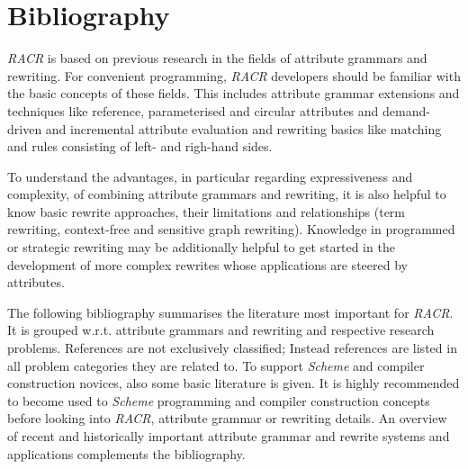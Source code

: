 

\chapter{Bibliography}

\emph{RACR} is based on previous research in the fields of attribute grammars
and rewriting. For convenient programming, \emph{RACR} developers should be familiar with
the basic concepts of these fields. This includes attribute grammar extensions and
techniques like reference, parameterised and circular attributes and demand-driven and
incremental attribute evaluation and rewriting basics like matching and rules consisting
of left- and righ-hand sides.

To understand the advantages, in particular regarding expressiveness and complexity, of
combining attribute grammars and rewriting, it is also helpful to know basic
rewrite approaches, their limitations and relationships (term rewriting, context-free and
sensitive graph rewriting). Knowledge in programmed or strategic rewriting
may be additionally helpful to get started in the development of more complex
rewrites whose applications are steered by attributes.

The following bibliography summarises the literature most important for
\emph{RACR}. It is grouped w.r.t. attribute grammars and rewriting and respective
research problems. References are not exclusively classified; Instead references
are listed in all problem categories they are related to. To support \emph{Scheme} and
compiler construction novices, also some basic literature is given. It is highly
recommended to become used to \emph{Scheme} programming and compiler construction
concepts before looking into \emph{RACR}, attribute grammar or rewriting details. An
overview of recent and historically important attribute grammar and rewrite systems and
applications complements the bibliography.

\printbibliography[heading=subbibliography,category=Scheme,title={Scheme Programming}]

\printbibliography[heading=subbibliography,category=CompilerConstruction,title={Compiler Construction: Introduction and Basics}]

\printbibliography[heading=subbibliography,category=AG:Foundations,title={Attribute Grammar Foundations}]
\printbibliography[heading=subbibliography,category=AG:Extensions,title={Attribute Grammar Extensions}]
\printbibliography[heading=subbibliography,category=AG:Incremental_Evaluation,title={Incremental Attribute Evaluation}]
\printbibliography[heading=subbibliography,category=AG:Systems_and_Applications,title={Attribute Grammar Systems and Applications}]

